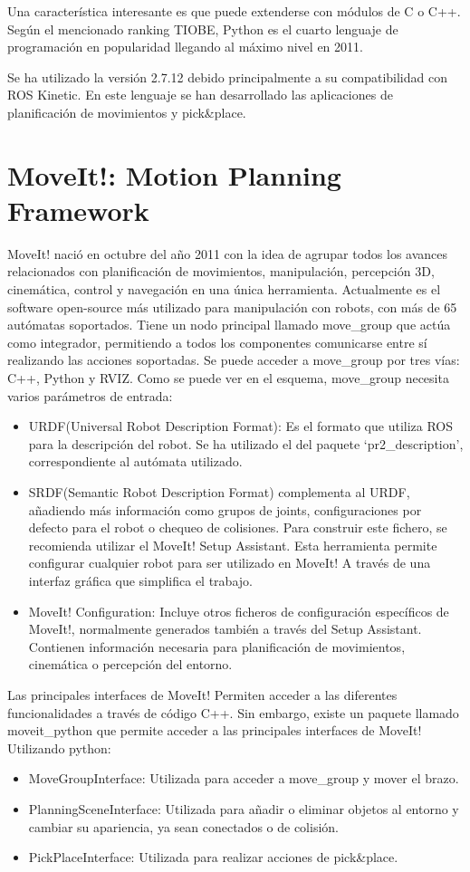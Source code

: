 \documentclass[12pt,spanish,chapterprefix, numbers=noenddot]{book}
\numberwithin{equation}{section}
\numberwithin{figure}{section}
\begin{document}
Una característica interesante es que puede extenderse con módulos de C o C++.
Según el mencionado ranking TIOBE, Python es el cuarto lenguaje de programación en popularidad llegando al máximo nivel en 2011. 

Se ha utilizado la versión 2.7.12 debido principalmente a su compatibilidad con ROS Kinetic. En este lenguaje se han desarrollado las aplicaciones de planificación de movimientos y pick&place. 

\section{MoveIt!: Motion Planning Framework}
MoveIt! nació en octubre del año 2011 con la idea de agrupar todos los avances relacionados con planificación de movimientos, manipulación, percepción 3D, cinemática, control y navegación en una única herramienta. Actualmente es el software open-source más utilizado para manipulación con robots, con más de 65 autómatas soportados. 
Tiene un nodo principal llamado move\_group que actúa como integrador, permitiendo a todos los componentes comunicarse entre sí realizando las acciones soportadas. 
Se puede acceder a move\_group por tres vías: C++, Python y RVIZ.
Como se puede ver en el esquema, move\_group necesita varios parámetros de entrada:
\begin{itemize}
\item URDF(Universal Robot Description Format): Es el formato que utiliza ROS para la descripción del robot. Se ha utilizado el del paquete ‘pr2\_description’, correspondiente al autómata utilizado.
\item SRDF(Semantic Robot Description Format) complementa al URDF, añadiendo más información como grupos de joints, configuraciones por defecto para el robot o chequeo de colisiones. Para construir este fichero, se recomienda utilizar el MoveIt! Setup Assistant. Esta herramienta permite configurar cualquier robot para ser utilizado en MoveIt! A través de una interfaz gráfica que simplifica el trabajo. 
\item MoveIt! Configuration: Incluye otros ficheros de configuración específicos de MoveIt!, normalmente generados también a través del Setup Assistant. Contienen información necesaria para planificación de movimientos, cinemática o percepción del entorno.
\end{itemize}
Las principales interfaces de MoveIt! Permiten acceder a las diferentes funcionalidades a través de código C++. Sin embargo, existe un paquete llamado moveit\_python que permite acceder a las principales interfaces de MoveIt! Utilizando python:
\begin{itemize}
\item MoveGroupInterface: Utilizada para acceder a move\_group y mover el brazo. 
\item PlanningSceneInterface: Utilizada para añadir o eliminar objetos al entorno y cambiar su apariencia, ya sean conectados o de colisión. 
\item PickPlaceInterface: Utilizada para realizar acciones de pick&place.
\end{itemize}
\end{document}
